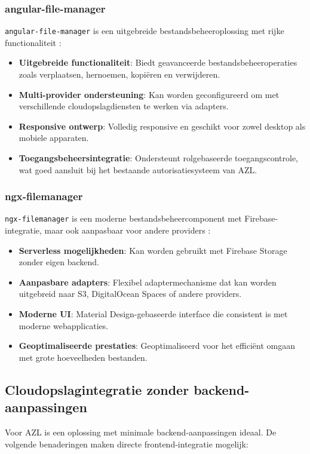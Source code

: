 \subsubsection{angular-file-manager}
\texttt{angular-file-manager} is een uitgebreide bestandsbeheeroplossing met rijke functionaliteit \autocite{angular_file_manager}:

\begin{itemize}
  \item \textbf{Uitgebreide functionaliteit}: Biedt geavanceerde bestandsbeheeroperaties zoals verplaatsen, hernoemen, kopiëren en verwijderen.
  \item \textbf{Multi-provider ondersteuning}: Kan worden geconfigureerd om met verschillende cloudopslagdiensten te werken via adapters.
  \item \textbf{Responsive ontwerp}: Volledig responsive en geschikt voor zowel desktop als mobiele apparaten.
  \item \textbf{Toegangsbeheersintegratie}: Ondersteunt rolgebaseerde toegangscontrole, wat goed aansluit bij het bestaande autorisatiesysteem van AZL.
\end{itemize}

\subsubsection{ngx-filemanager}
\texttt{ngx-filemanager} is een moderne bestandsbeheercomponent met Firebase-integratie, maar ook aanpasbaar voor andere providers \autocite{ngx_filemanager}:

\begin{itemize}
  \item \textbf{Serverless mogelijkheden}: Kan worden gebruikt met Firebase Storage zonder eigen backend.
  \item \textbf{Aanpasbare adapters}: Flexibel adaptermechanisme dat kan worden uitgebreid naar S3, DigitalOcean Spaces of andere providers.
  \item \textbf{Moderne UI}: Material Design-gebaseerde interface die consistent is met moderne webapplicaties.
  \item \textbf{Geoptimaliseerde prestaties}: Geoptimaliseerd voor het efficiënt omgaan met grote hoeveelheden bestanden.
\end{itemize}

\subsection{Cloudopslagintegratie zonder backend-aanpassingen}
Voor AZL is een oplossing met minimale backend-aanpassingen ideaal. De volgende benaderingen maken directe frontend-integratie mogelijk:

